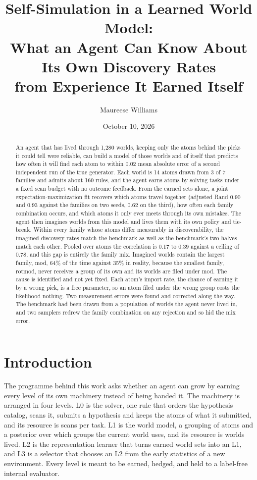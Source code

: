 \documentclass[11pt]{article}
\title{Self-Simulation in a Learned World Model:\\ What an Agent Can Know About Its Own Discovery Rates\\ from Experience It Earned Itself}
\author{Maureese Williams}
\date{October 10, 2026}
\begin{document}
\maketitle

\begin{abstract}
An agent that has lived through 1,280 worlds, keeping only the atoms behind the picks it could tell were reliable, can build a model of those worlds and of itself that predicts how often it will find each atom to within 0.02 mean absolute error of a second independent run of the true generator. Each world is 14 atoms drawn from 3 of 7 families and admits about 160 rules, and the agent earns atoms by solving tasks under a fixed scan budget with no outcome feedback. From the earned sets alone, a joint expectation-maximization fit recovers which atoms travel together (adjusted Rand 0.90 and 0.93 against the families on two seeds, 0.62 on the third), how often each family combination occurs, and which atoms it only ever meets through its own mistakes. The agent then imagines worlds from this model and lives them with its own policy and tie-break. Within every family whose atoms differ measurably in discoverability, the imagined discovery rates match the benchmark as well as the benchmark's two halves match each other. Pooled over atoms the correlation is 0.17 to 0.39 against a ceiling of 0.78, and this gap is entirely the family mix. Imagined worlds contain the largest family, mod, 64\% of the time against 35\% in reality, because the smallest family, rotmod, never receives a group of its own and its worlds are filed under mod. The cause is identified and not yet fixed. Each atom's import rate, the chance of earning it by a wrong pick, is a free parameter, so an atom filed under the wrong group costs the likelihood nothing. Two measurement errors were found and corrected along the way. The benchmark had been drawn from a population of worlds the agent never lived in, and two samplers redrew the family combination on any rejection and so hid the mix error.
\end{abstract}

\section{Introduction}

The programme behind this work asks whether an agent can grow by earning every level of its own machinery instead of being handed it. The machinery is arranged in four levels. L0 is the solver, one rule that orders the hypothesis catalog, scans it, submits a hypothesis and keeps the atoms of what it submitted, and its resource is scans per task. L1 is the world model, a grouping of atoms and a posterior over which groups the current world uses, and its resource is worlds lived. L2 is the representation learner that turns earned world sets into an L1, and L3 is a selector that chooses an L2 from the early statistics of a new environment. Every level is meant to be earned, hedged, and held to a label-free internal evaluator.
\end{document}
